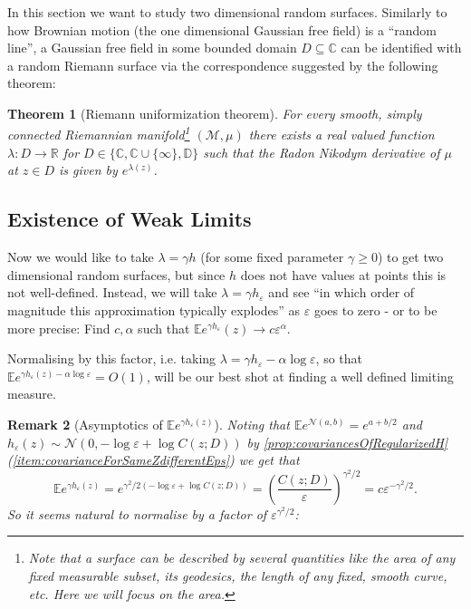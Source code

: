\documentclass[11pt,reqno]{amsart}
\numberwithin{equation}{section}
\newtheorem{thm}{Theorem}[section]
\newtheorem{rem}[thm]{Remark}
\newcommand{\eps}{\varepsilon}
\begin{document}
In this section we want to study two dimensional random surfaces. Similarly to how Brownian motion (the one dimensional Gaussian free field) is a ``random line'', a Gaussian free field in some bounded domain $D\subseteq\mathbb C$ can be identified with a random Riemann surface via the correspondence suggested by the following theorem:
\begin{thm}[Riemann uniformization theorem]
	For every smooth, simply connected Riemannian manifold\footnote{Note that a surface can be described by several quantities like the area of any fixed measurable subset, its geodesics, the length of any fixed, smooth curve, etc. Here we will focus on the area.} $(\mathcal M,\mu)$ there exists a real valued function $\lambda:D\rightarrow\mathbb R$ for $D\in\{\mathbb C,\mathbb C\cup\{\infty\},\mathbb D\}$ such that the Radon Nikodym derivative of $\mu$ at $z\in D$ is given by $e^{\lambda(z)}$.
\end{thm}

\subsection{Existence of Weak Limits}

Now we would like to take $\lambda = \gamma h$ (for some fixed parameter $\gamma\geq 0$) to get two dimensional random surfaces, but since $h$ does not have values at points this is not well-defined. Instead, we will take $\lambda = \gamma h_\eps$ and see ``in which order of magnitude this approximation typically explodes'' as $\eps$ goes to zero - or to be more precise: Find $c,\alpha$ such that $\mathbb E e^{\gamma h_\eps}(z) \rightarrow c\eps^\alpha$.

Normalising by this factor, i.e. taking $\lambda=\gamma h_\eps - \alpha\log\eps$, so that $\mathbb E e^{\gamma h_\eps(z) - \alpha\log\eps}=O(1)$, will be our best shot at finding a well defined limiting measure.

\begin{rem}[Asymptotics of $\mathbb E e^{\gamma h_\eps(z)}$]
	Noting that $\mathbb E e^{\mathcal N(a,b)}=e^{a+b/2}$ and $h_\eps(z)\sim\mathcal N(0,-\log\eps+\log C(z;D))$ by \ref{prop:covariancesOfRegularizedH}(\ref{item:covarianceForSameZdifferentEps}) we get that $$\mathbb E e^{\gamma h_\eps(z)} = e^{\gamma^2/2(-\log\eps+\log C(z;D))}=\left(\frac{C(z;D)}{\eps}\right)^{\gamma^2/2} = c\eps^{-\gamma^2/2}.$$
	So it seems natural to normalise by a factor of $\eps^{\gamma^2/2}$:
\end{rem}
\end{document}
